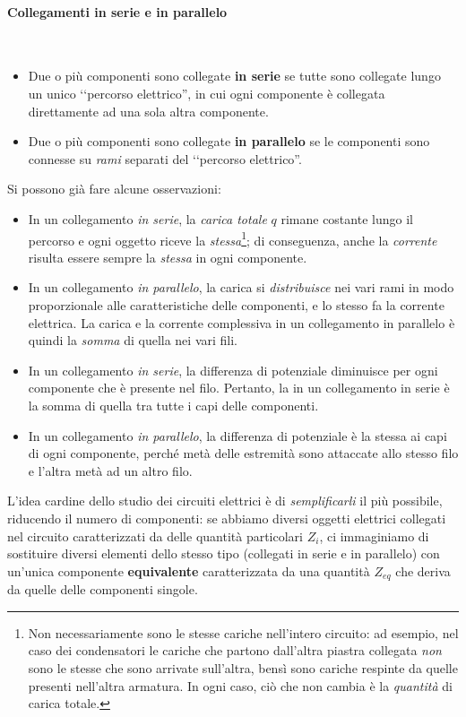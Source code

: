 \paragraph{Collegamenti in serie e in parallelo}
\begin{define}~
	\begin{itemize}
		\item Due o più componenti sono collegate \textbf{in serie} se tutte sono collegate lungo un unico ‘‘percorso elettrico'', in cui ogni componente è collegata direttamente ad una sola altra componente.
		\item Due o più componenti sono collegate \textbf{in parallelo} se le componenti sono connesse su \textit{rami} separati del ‘‘percorso elettrico''.
	\end{itemize}
\end{define}
Si possono già fare alcune osservazioni:
\begin{itemize}
	\item In un collegamento \textit{in serie}, la \textit{carica totale} $q$ rimane costante lungo il percorso e ogni oggetto riceve la \textit{stessa}\footnote{Non necessariamente sono le stesse cariche nell'intero circuito: ad esempio, nel caso dei condensatori le cariche che partono dall'altra piastra collegata \textit{non} sono le stesse che sono arrivate sull'altra, bensì sono cariche respinte da quelle presenti nell'altra armatura. In ogni caso, ciò che non cambia è la \textit{quantità} di carica totale.}; di conseguenza, anche la \textit{corrente} risulta essere sempre la \textit{stessa} in ogni componente.
	\item In un collegamento \textit{in parallelo}, la carica si \textit{distribuisce} nei vari rami in modo proporzionale alle caratteristiche delle componenti, e lo stesso fa la corrente elettrica. La carica e la corrente complessiva in un collegamento in parallelo è quindi la \textit{somma} di quella nei vari fili.
	\item In un collegamento \textit{in serie}, la differenza di potenziale diminuisce per ogni componente che è presente nel filo. Pertanto, la \ddp in un collegamento in serie è la somma di quella tra tutte i capi delle componenti.
	\item In un collegamento \textit{in parallelo}, la differenza di potenziale è la stessa ai capi di ogni componente, perché metà delle estremità sono attaccate allo stesso filo e l'altra metà ad un altro filo.
\end{itemize}
L'idea cardine dello studio dei circuiti elettrici è di \textit{semplificarli} il più possibile, riducendo il numero di componenti: se abbiamo diversi oggetti elettrici collegati nel circuito caratterizzati da delle quantità particolari $Z_i$, ci immaginiamo di sostituire diversi elementi dello stesso tipo (collegati in serie e in parallelo) con un'unica componente \textbf{equivalente} caratterizzata da una quantità $Z_{eq}$ che deriva da quelle delle componenti singole.
